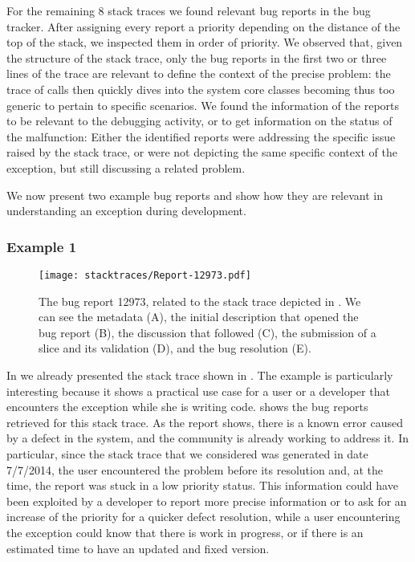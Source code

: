 For the remaining 8 stack traces we found relevant bug reports in the bug tracker.
After assigning every report a priority depending on the distance of the top of the stack, we inspected them in order of priority.
We observed that, given the structure of the stack trace, only the bug reports in the first two or three lines of the trace are relevant to define the context of the precise problem: the trace of calls then quickly dives into the system core classes becoming thus too generic to pertain to specific scenarios.
We found the information of the reports to be relevant to the debugging activity, or to get information on the status of the malfunction: Either the identified reports were addressing the specific issue raised by the stack trace, or were not depicting the same specific context of the exception, but still discussing a related problem.

We now present two example bug reports and show how they are relevant in understanding an exception during development.


\subsubsection{Example 1}

\begin{figure}[h!t]
\begin{center}
  \texttt{[image: stacktraces/Report-12973.pdf]}
  \caption{The bug report 12973, related to the stack trace depicted in .
We can see the metadata (A), the initial description that opened the bug report (B), the discussion that followed (C), the submission of a slice and its validation (D), and the bug resolution (E).}
  \label{fig:report}
\end{center}
\end{figure}

In  we already presented the stack trace shown in .
The example is particularly interesting because it shows a practical use case for a user or a developer that encounters the exception while she is writing code.
 shows the bug reports retrieved for this stack trace.
As the report shows, there is a known error caused by a defect in the system, and the community is already working to address it.
In particular, since the stack trace that we considered was generated in date 7/7/2014, the user encountered the problem before its resolution and, at the time, the report was stuck in a low priority status.
This information could have been exploited by a developer to report more precise information or to ask for an increase of the priority for a quicker defect resolution, while a user encountering the exception could know that there is work in progress, or if there is an estimated time to have an updated and fixed version.

